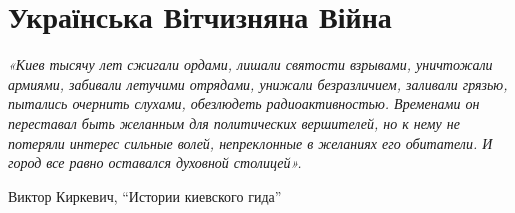  
 
 
 
 
\chapter{Українська Вітчизняна Війна}

\begin{center}
\Large\em\color{blue}
«Киев тысячу лет сжигали ордами, лишали святости взрывами, уничтожали армиями,
забивали летучими отрядами, унижали безразличием, заливали грязью, пытались
очернить слухами, обезлюдеть радиоактивностью. Временами он переставал быть
желанным для политических вершителей, но к нему не потеряли интерес сильные
волей, непреклонные в желаниях его обитатели. И город все равно оставался
духовной столицей».

Виктор Киркевич, \enquote{Истории киевского гида}
\end{center}















